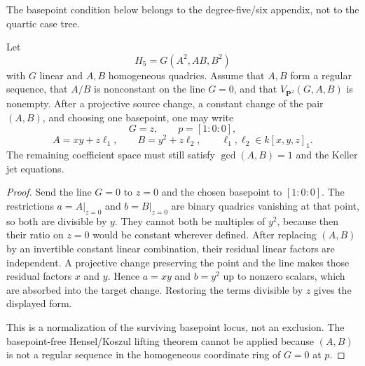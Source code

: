 The basepoint condition below belongs to the degree-five/six appendix, not to
the quartic case tree.

\begin{proposition}[Residual normal form for the quintic $(g,e)=(1,2)$ boundary]
Let
\[
H_5=G(A^2,AB,B^2)
\]
with $G$ linear and $A,B$ homogeneous quadrics.  Assume that $A,B$ form a
regular sequence, that $A/B$ is nonconstant on the line $G=0$, and that
$V_{\mathbf P^2}(G,A,B)$ is nonempty.  After a projective source change, a
constant change of the pair $(A,B)$, and choosing one basepoint, one may write
\[
G=z,\qquad p=[1:0:0],
\]
\[
A=xy+z\ell_1,
\qquad
B=y^2+z\ell_2,
\qquad \ell_1,\ell_2\in k[x,y,z]_1.
\]
The remaining coefficient space must still satisfy $\gcd(A,B)=1$ and the
Keller jet equations.
\end{proposition}

\begin{proof}
Send the line $G=0$ to $z=0$ and the chosen basepoint to $[1:0:0]$.  The
restrictions $a=A|_{z=0}$ and $b=B|_{z=0}$ are binary quadrics vanishing at
that point, so both are divisible by $y$.  They cannot both be multiples of
$y^2$, because then their ratio on $z=0$ would be constant wherever defined.
After replacing $(A,B)$ by an invertible constant linear combination, their
residual linear factors are independent.  A projective change preserving the
point and the line makes those residual factors $x$ and $y$.  Hence
$a=xy$ and $b=y^2$ up to nonzero scalars, which are absorbed into the target
change.  Restoring the terms divisible by $z$ gives the displayed form.

This is a normalization of the surviving basepoint locus, not an exclusion.
The basepoint-free Hensel/Koszul lifting theorem cannot be applied because
$(A,B)$ is not a regular sequence in the homogeneous coordinate ring of
$G=0$ at $p$.
\end{proof}
